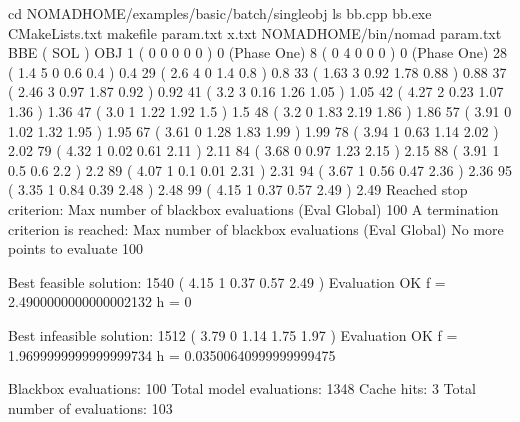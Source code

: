 \documentclass[letterpaper,10pt,english]{sphinxmanual}
\begin{document}
\begin{sphinxVerbatim}[commandchars=\\\{\}]
\PYGZgt{} cd \PYGZdl{}NOMAD\PYGZus{}HOME/examples/basic/batch/single\PYGZus{}obj
\PYGZgt{} ls
bb.cpp bb.exe CMakeLists.txt makefile param.txt x.txt
\PYGZgt{}\PYGZdl{}NOMAD\PYGZus{}HOME/bin/nomad param.txt
BBE ( SOL ) OBJ
  1   (   0          0          0          0          0        )    0        (Phase One)
  8   (   0          4          0          0          0        )    0        (Phase One)
  28  (   1.4        5          0         \PYGZhy{}0.6       \PYGZhy{}0.4      )   \PYGZhy{}0.4
  29  (   2.6        4          0         \PYGZhy{}1.4       \PYGZhy{}0.8      )   \PYGZhy{}0.8
  33  (   1.63       3          0.92      \PYGZhy{}1.78      \PYGZhy{}0.88     )   \PYGZhy{}0.88
  37  (   2.46       3          0.97      \PYGZhy{}1.87      \PYGZhy{}0.92     )   \PYGZhy{}0.92
  41  (   3.2        3          0.16      \PYGZhy{}1.26      \PYGZhy{}1.05     )   \PYGZhy{}1.05
  42  (   4.27       2         \PYGZhy{}0.23      \PYGZhy{}1.07      \PYGZhy{}1.36     )   \PYGZhy{}1.36
  47  (   3.0        1          1.22      \PYGZhy{}1.92      \PYGZhy{}1.5      )   \PYGZhy{}1.5
  48  (   3.2        0          1.83      \PYGZhy{}2.19      \PYGZhy{}1.86     )   \PYGZhy{}1.86
  57  (   3.91      \PYGZhy{}0          1.02      \PYGZhy{}1.32      \PYGZhy{}1.95     )   \PYGZhy{}1.95
  67  (   3.61      \PYGZhy{}0          1.28      \PYGZhy{}1.83      \PYGZhy{}1.99     )   \PYGZhy{}1.99
  78  (   3.94       1          0.63      \PYGZhy{}1.14      \PYGZhy{}2.02     )   \PYGZhy{}2.02
  79  (   4.32       1          0.02      \PYGZhy{}0.61      \PYGZhy{}2.11     )   \PYGZhy{}2.11
  84  (   3.68       0          0.97      \PYGZhy{}1.23      \PYGZhy{}2.15     )   \PYGZhy{}2.15
  88  (   3.91       1          0.5       \PYGZhy{}0.6       \PYGZhy{}2.2      )   \PYGZhy{}2.2
  89  (   4.07       1          0.1        0.01      \PYGZhy{}2.31     )   \PYGZhy{}2.31
  94  (   3.67       1          0.56      \PYGZhy{}0.47      \PYGZhy{}2.36     )   \PYGZhy{}2.36
  95  (   3.35       1          0.84      \PYGZhy{}0.39      \PYGZhy{}2.48     )   \PYGZhy{}2.48
  99  (   4.15       1         \PYGZhy{}0.37       0.57      \PYGZhy{}2.49     )   \PYGZhy{}2.49
  Reached stop criterion: Max number of blackbox evaluations (Eval Global) 100
  A termination criterion is reached: Max number of blackbox evaluations (Eval Global) No more points to evaluate 100

  Best feasible solution:     \PYGZsh{}1540 ( 4.15 1 \PYGZhy{}0.37 0.57 \PYGZhy{}2.49 )   Evaluation OK    f =  \PYGZhy{}2.4900000000000002132     h =   0

  Best infeasible solution:   \PYGZsh{}1512 ( 3.79 0 1.14 \PYGZhy{}1.75 \PYGZhy{}1.97 )   Evaluation OK    f =  \PYGZhy{}1.9699999999999999734     h =   0.03500640999999999475

  Blackbox evaluations:        100
  Total model evaluations:     1348
  Cache hits:                  3
  Total number of evaluations: 103
\end{sphinxVerbatim}
\end{document}
